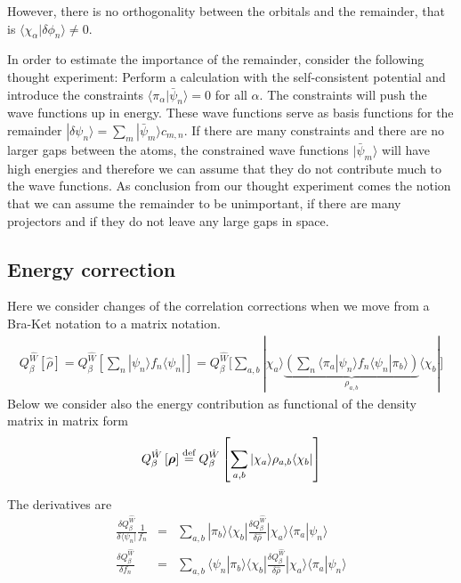 \documentclass[11pt,a4paper]{report}
\begin{document}
However, there is no orthogonality between the orbitals and the
remainder, that is $\langle\chi_\alpha|\delta\phi_n\rangle\neq0$.

In order to estimate the importance of the remainder, consider the
following thought experiment: Perform a calculation with the
self-consistent potential and introduce the constraints
$\langle\pi_\alpha|\bar{\psi}_n\rangle=0$ for all $\alpha$. The
constraints will push the wave functions up in energy. These wave
functions serve as basis functions for the remainder
$|\delta\psi_n\rangle=\sum_m|\bar{\psi}_m\rangle c_{m,n}$. If there
are many constraints and there are no larger gaps between the atoms,
the constrained wave functions $|\bar{\psi}_m\rangle$ will have high
energies and therefore we can assume that they do not contribute much
to the wave functions. As conclusion from our thought experiment comes
the notion that we can assume the remainder to be unimportant, if
there are many projectors and if they do not leave any large gaps in
space.

\subsection{Energy correction}
Here we consider changes of the correlation corrections when we move
from a Bra-Ket notation to a matrix notation.
\begin{eqnarray}
Q_\beta^{\hat{W}}\left[\hat{\rho}\right]
=Q_\beta^{\hat{W}}\left[\sum_n|\psi_n\rangle f_n\langle\psi_n|\right]
=
Q_\beta^{\hat{W}}\biggl[\sum_{a,b}|\chi_a\rangle
\underbrace{\left(
\sum_n\langle\pi_a|\psi_n\rangle f_n\langle\psi_n|\pi_b\rangle
\right)}_{\rho_{a,b}}\langle\chi_b|
\biggr]
\end{eqnarray}
Below we consider also the energy contribution as functional of the
density matrix in matrix form
\begin{eqnarray}
Q_\beta^{\hat{W}}\left[\bm{\rho}\right]\stackrel{\text{def}}{=}
Q_\beta^{\hat{W}}\left[\sum_{a,b}|\chi_a\rangle\rho_{a,b}\langle\chi_b|\right]
\end{eqnarray}

The derivatives are
\begin{eqnarray}
\frac{\delta Q_\beta^{\hat{W}}}{\delta\langle\psi_n|}\frac{1}{f_n}
&=&\sum_{a,b}|\pi_b\rangle
\langle\chi_b|\frac{\delta Q_\beta^{\hat{W}}}{\delta\hat{\rho}}
|\chi_a\rangle
\langle\pi_a|\psi_n\rangle 
\nonumber\\
\frac{\delta Q_\beta^{\hat{W}}}{\delta f_n}
&=&\sum_{a,b}\langle\psi_n|\pi_b\rangle
\langle\chi_b|\frac{\delta Q_\beta^{\hat{W}}}{\delta\hat{\rho}}
|\chi_a\rangle
\langle\pi_a|\psi_n\rangle 
\end{eqnarray}
\end{document}
